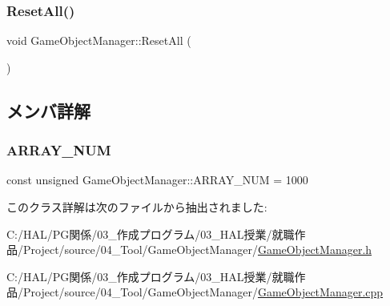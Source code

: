 \mbox{\label{class_game_object_manager_a902c42587f383de65de07c132d51d27e}} 
\subsubsection{\texorpdfstring{Reset\+All()}{ResetAll()}}
{\footnotesize\ttfamily void Game\+Object\+Manager\+::\+Reset\+All (\begin{DoxyParamCaption}{ }\end{DoxyParamCaption})\hspace{0.3cm}{\ttfamily [static]}}



\subsection{メンバ詳解}
\mbox{\label{class_game_object_manager_a591934d64d750c10c03c908371470681}} 
\subsubsection{\texorpdfstring{A\+R\+R\+A\+Y\+\_\+\+N\+UM}{ARRAY\_NUM}}
{\footnotesize\ttfamily const unsigned Game\+Object\+Manager\+::\+A\+R\+R\+A\+Y\+\_\+\+N\+UM = 1000\hspace{0.3cm}{\ttfamily [static]}}



このクラス詳解は次のファイルから抽出されました\+:\begin{DoxyCompactItemize}
\item 
C\+:/\+H\+A\+L/\+P\+G関係/03\+\_\+作成プログラム/03\+\_\+\+H\+A\+L授業/就職作品/\+Project/source/04\+\_\+\+Tool/\+Game\+Object\+Manager/\mbox{\hyperlink{_game_object_manager_8h}{Game\+Object\+Manager.\+h}}\item 
C\+:/\+H\+A\+L/\+P\+G関係/03\+\_\+作成プログラム/03\+\_\+\+H\+A\+L授業/就職作品/\+Project/source/04\+\_\+\+Tool/\+Game\+Object\+Manager/\mbox{\hyperlink{_game_object_manager_8cpp}{Game\+Object\+Manager.\+cpp}}\end{DoxyCompactItemize}
